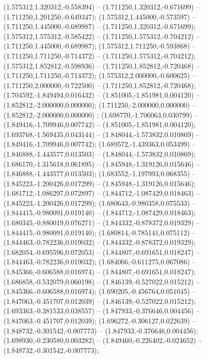  (1.575312,1.320312,-0.558394) -- (1.711250,1.320312,-0.671699) -- (1.711250,1.201250,-0.649347);
 (1.575312,1.445000,-0.573597) -- (1.711250,1.445000,-0.689987) -- (1.711250,1.320312,-0.671699);
 (1.575312,1.575312,-0.585422) -- (1.711250,1.575312,-0.704212) -- (1.711250,1.445000,-0.689987);
 (1.575312,1.711250,-0.593868) -- (1.711250,1.711250,-0.714372) -- (1.711250,1.575312,-0.704212);
 (1.575312,1.852812,-0.598936) -- (1.711250,1.852812,-0.720468) -- (1.711250,1.711250,-0.714372);
 (1.575312,2.000000,-0.600625) -- (1.711250,2.000000,-0.722500) -- (1.711250,1.852812,-0.720468);
 (1.704592,-1.849494,0.016432) -- (1.851005,-1.851981,0.004120) -- (1.852812,-2.000000,0.000000);
 (1.711250,-2.000000,0.000000) -- (1.852812,-2.000000,0.000000) ;
 (1.698770,-1.706063,0.030799) -- (1.849416,-1.709946,0.007742) -- (1.851005,-1.851981,0.004120);
 (1.693768,-1.569435,0.043144) -- (1.848044,-1.573832,0.010869) -- (1.849416,-1.709946,0.007742);
 (1.689572,-1.439363,0.053499) -- (1.846888,-1.443577,0.013503) -- (1.848044,-1.573832,0.010869);
 (1.686170,-1.315618,0.061895) -- (1.845948,-1.319126,0.015646) -- (1.846888,-1.443577,0.013503);
 (1.683552,-1.197993,0.068355) -- (1.845223,-1.200426,0.017299) -- (1.845948,-1.319126,0.015646);
 (1.681712,-1.086297,0.072897) -- (1.844712,-1.087429,0.018463) -- (1.845223,-1.200426,0.017299);
 (1.680643,-0.980358,0.075533) -- (1.844415,-0.980091,0.019140) -- (1.844712,-1.087429,0.018463);
 (1.680345,-0.880019,0.076271) -- (1.844332,-0.878372,0.019329) -- (1.844415,-0.980091,0.019140);
 (1.680814,-0.785141,0.075112) -- (1.844463,-0.782236,0.019032) -- (1.844332,-0.878372,0.019329);
 (1.682054,-0.695596,0.072053) -- (1.844807,-0.691651,0.018247) -- (1.844463,-0.782236,0.019032);
 (1.684066,-0.611275,0.067086) -- (1.845366,-0.606588,0.016974) -- (1.844807,-0.691651,0.018247);
 (1.686858,-0.532079,0.060198) -- (1.846139,-0.527022,0.015212) -- (1.845366,-0.606588,0.016974);
 (1.690205,-0.456764,0.051045) -- (1.847063,-0.451707,0.012039) -- (1.846139,-0.527022,0.015212);
 (1.693363,-0.381533,0.038557) -- (1.847933,-0.376646,0.004456) -- (1.847063,-0.451707,0.012039);
 (1.696272,-0.306127,0.022639) -- (1.848732,-0.301542,-0.007773) -- (1.847933,-0.376646,0.004456);
 (1.698930,-0.230580,0.003282) -- (1.849460,-0.226402,-0.024652) -- (1.848732,-0.301542,-0.007773);
